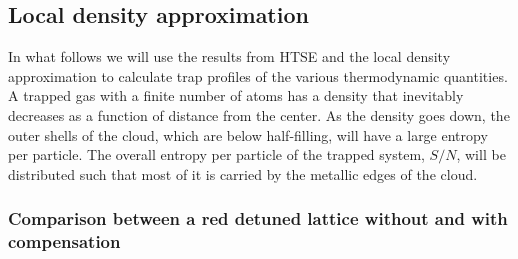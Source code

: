 \documentclass[11pt,letter]{article}
\begin{document}
\subsection{Local density approximation}

In what follows we will use the results from HTSE and the local density
approximation to calculate trap profiles of the various thermodynamic
quantities.  A trapped gas with a finite number of atoms has a density that
inevitably decreases as a function of distance from the center.   As the
density goes down, the outer shells of the cloud, which are below half-filling,
will have a large entropy per particle.   The overall entropy per particle of
the trapped system, $S/N$, will be distributed such that most of it is carried by
the metallic edges of the cloud.   

\subsubsection{Comparison between a red detuned lattice without and with
compensation}
\label{sec:compare-big-small-waist}
\end{document}
